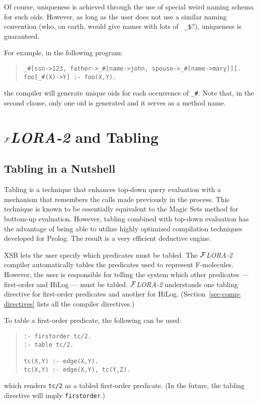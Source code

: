 \documentclass[11pt]{article}
\newcommand{\FLORA}{{\mbox{${\cal F}${\small\it LORA}\rm\emph{-2}}}\xspace}
\begin{document}
Of course, uniqueness is achieved through the use of special weird naming
schema for such oids. However, as long as the user does not use a similar
naming convention (who, on earth, would give names with lots of {\tt
  \_\$}?), uniqueness is guaranteed.


For example, in the following program:
\begin{quote}
\begin{verbatim}
_#[ssn->123, father->_#[name->john, spouse->_#[name->mary]]].
foo[_#(X)->Y] :- foo(X,Y).
\end{verbatim}
\end{quote}
the compiler will generate unique oids for each occurrence of {\tt \_\#}.
Note that, in the second clause, only one oid is generated and it serves as
a method name.



\section{\FLORA and Tabling}\label{sec-tabling-flora}


\subsection{Tabling in a Nutshell}


%
Tabling is a technique that enhances top-down query evaluation with a
mechanism that remembers the calls made previously in the process.  This
technique is known to be essentially equivalent to the Magic Sets method
for bottom-up evaluation. However, tabling combined with top-down
evaluation has the advantage of being able to utilize highly optimized
compilation techniques developed for Prolog. The result is a very efficient
deductive engine.

XSB lets the user specify which predicates must be tabled.  The \FLORA
compiler automatically tables the predicates used to represent F-molecules.
However, the user is responsible for telling the system which other
predicates --- first-order and HiLog --- must be tabled.  \FLORA
understands one tabling directive for first-order predicates and another
for HiLog.  (Section~\ref{sec-comp-directives} lists all the compiler
directives.)

%
To table a first-order predicate, the following can be used:
\begin{quote}
\begin{verbatim}
:- firstorder tc/2.
:- table tc/2.

tc(X,Y) :- edge(X,Y).
tc(X,Y) :- edge(X,Y), tc(Y,Z).
\end{verbatim}
\end{quote}
which renders {\tt tc/2}  as a tabled first-order predicate.
(In the future, the tabling directive will imply {\tt firstorder}.)
\end{document}
